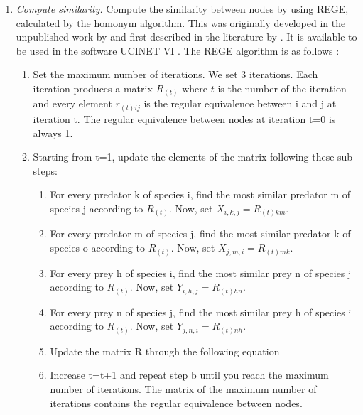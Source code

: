 \documentclass[twocolumn]{article}
\begin{document}
\begin{appendices}
\begin{enumerate}
			\item \emph{Compute similarity.} \smallskip \newline
			Compute the similarity between nodes by using REGE, calculated by the homonym algorithm. This was originally developed in the unpublished work by \citet{White1980,White1982,White1984} and first described in the literature by \citet{Borgatti1993}. It is available to be used in the software UCINET VI \citet{Borgatti2002}. The REGE algorithm is as follows \citep{Jordan2018}:

				      \begin{enumerate}

					      \item Set the maximum number of iterations. We set 3 iterations. Each iteration produces a matrix $R_{\left(t\right)}$ where $t$ is the number of the iteration and every element $r_{\left(t\right)ij}$ is the regular equivalence between i and j at iteration t. The regular equivalence between nodes at iteration t=0 is always 1.

					      \item Starting from t=1, update the elements of the matrix following these sub-steps:

					            \begin{enumerate}
						            \item For every predator k of species i, find the most similar predator m of species j according to  $R_{\left(t\right)}$.
						                  Now, set $X_{i,k,j}=R_{\left(t\right)km}.$
						            \item For every predator m of species j, find the most similar predator k of species o according to $R_{\left(t\right)}$.
						                  Now, set $X_{j,m,i}=R_{\left(t\right)mk}$.
						            \item For every prey h of species i, find the most similar prey n of species j according to $R_{\left(t\right)}$.
						                  Now, set $Y_{i,h,j}=R_{\left(t\right)hn}$.
						            \item For every prey n of species j, find the most similar prey h of species i according to $R_{\left(t\right)}$.
						                  Now, set $Y_{j,n,i}=R_{\left(t\right)nh}$.
						            \item Update the matrix R through the following equation
						            \item Increase t=t+1 and repeat step b until you reach the maximum number of iterations. The matrix of the maximum number of iterations contains the regular equivalence between nodes.
					            \end{enumerate}


\end{enumerate}
\end{enumerate}
\end{appendices}
\end{document}
